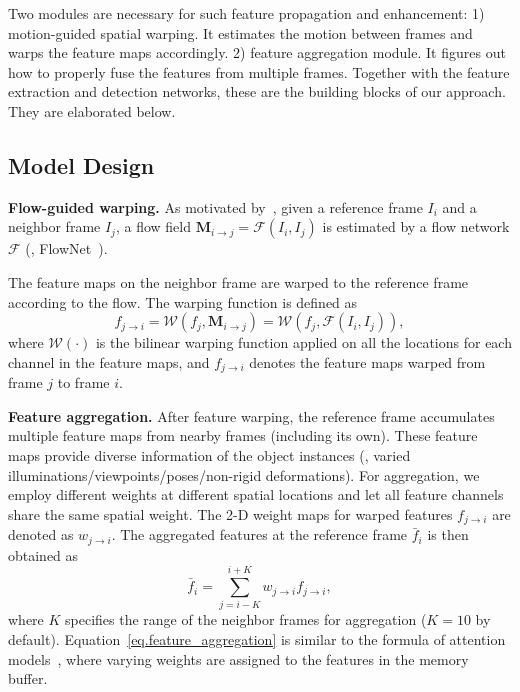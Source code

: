 \documentclass[10pt,twocolumn,letterpaper]{article}
\begin{document}
Two modules are necessary for such feature propagation and enhancement: 1) motion-guided spatial warping. It estimates the motion between frames and warps the feature maps accordingly. 2) feature aggregation module. It figures out how to properly fuse the features from multiple frames. Together with the feature extraction and detection networks, these are the building blocks of our approach. They are elaborated below.


\subsection{Model Design}
\textbf{Flow-guided warping.} As motivated by~\cite{zhu2016dff}, given a reference frame $I_i$ and a neighbor frame $I_j$, a flow field $\mathbf{M}_{i \rightarrow j} = \mathcal{F}(I_i, I_j)$ is estimated by a flow network $\mathcal{F}$ (\eg, FlowNet~\cite{dosovitskiy2015flownet}).

The feature maps on the neighbor frame are warped to the reference frame according to the flow. The warping function is defined as
\begin{equation}
f_{j \rightarrow i} = \mathcal{W}(f_j, \mathbf{M}_{i \rightarrow j}) = \mathcal{W}(f_j, \mathcal{F}(I_i, I_j)),
\label{eq.feature_warping}
\end{equation}
where $\mathcal{W}(\cdot)$ is the bilinear warping function applied on all the locations for each channel in the feature maps, and $f_{j \rightarrow i} $ denotes the feature maps warped from frame $j$ to frame $i$.

\textbf{Feature aggregation.} After feature warping, the reference frame accumulates multiple feature maps from nearby frames (including its own). These feature maps provide diverse information of the object instances (\eg, varied illuminations/viewpoints/poses/non-rigid deformations). For aggregation, we employ different weights at different spatial locations and let all feature channels share the same spatial weight. The 2-D weight maps for warped features $f_{j \rightarrow i}$ are denoted as $w_{j \rightarrow i}$. The aggregated features at the reference frame $\bar f_i$ is then obtained as
\begin{equation}
\bar f_i = {\sum}_{j=i-K}^{i+K} w_{j \rightarrow i} f_{j \rightarrow i},
\label{eq.feature_aggregation}
\end{equation}
where $K$ specifies the range of the neighbor frames for aggregation ($K=10$ by default). Equation~\eqref{eq.feature_aggregation} is similar to the formula of attention models~\cite{rush2015attention}, where varying weights are assigned to the features in the memory buffer.
\end{document}
